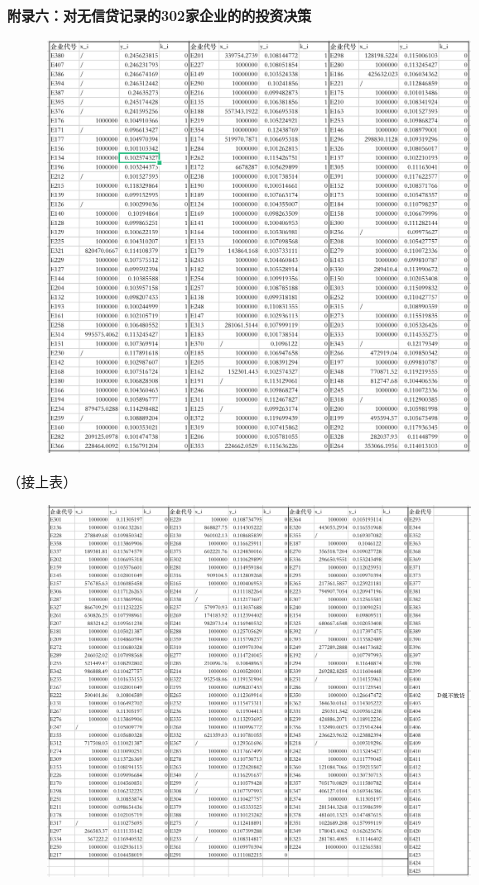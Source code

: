 \documentclass[bwprint]{cumcm}
\begin{document}
\begin{appendices}
\newpage
 \noindent \textbf{附录六：对无信贷记录的302家企业的的投资决策}
 \begin{figure}[h]%
	\centering  %
	\includegraphics[width=1\linewidth]{figures/T2_1.jpg}  %
	\label{fig:mcmthesis-logo}   %
\end{figure}

\newpage
（接上表）
 \begin{figure}[h]%
	\centering  %
	\includegraphics[width=1\linewidth]{figures/T2_2.jpg}  %
	\label{fig:mcmthesis-logo}   %
\end{figure}




\end{appendices}
\end{document}
